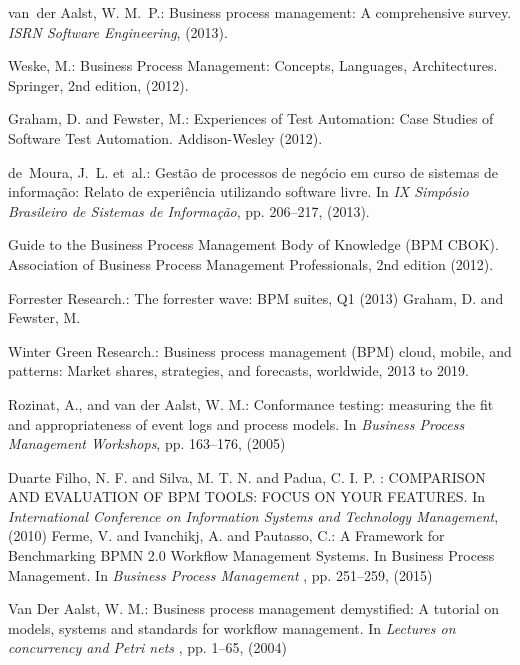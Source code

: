 \documentclass[runningheads,a4paper]{llncs}
\begin{document}
\begin{thebibliography}{4}

van~der Aalst, W. M.~P.: Business process management: A comprehensive survey. {\em ISRN Software Engineering}, (2013).

Weske, M.: Business Process Management: Concepts, Languages, Architectures. Springer, 2nd edition, (2012).

Graham, D. and Fewster, M.: Experiences of Test Automation: Case Studies of Software Test Automation. Addison-Wesley (2012).

de~Moura, J.~L. et~al.: Gestão de processos de negócio em curso de sistemas de
  informação: Relato de experiência utilizando software livre. In {\em IX Simpósio Brasileiro de Sistemas de Informação}, pp.
  206--217, (2013).

 Guide to the Business Process Management Body of Knowledge (BPM
  CBOK). Association of Business Process Management Professionals, 2nd
  edition (2012).

Forrester Research.: The forrester wave: {BPM} suites, {Q1} (2013)
Graham, D. and Fewster, M.


Winter Green Research.: Business process management (BPM) cloud, mobile, and patterns: Market shares, strategies, and forecasts, worldwide, 2013 to 2019.


  
Rozinat, A., and van der Aalst, W. M.: Conformance testing: measuring the fit and appropriateness of event logs and process models. In {\em Business Process Management Workshops}, pp.
  163--176, (2005)
  
Duarte Filho, N. F. and Silva, M. T. N. and Padua, C. I. P. : COMPARISON AND EVALUATION OF BPM TOOLS: FOCUS ON YOUR FEATURES. In {\em International Conference on Information Systems and Technology Management}, (2010)
Ferme, V. and Ivanchikj, A. and Pautasso, C.: A Framework for Benchmarking BPMN 2.0 Workflow Management Systems. In Business Process Management. In {\em Business Process Management }, pp.
  251--259, (2015)
  
Van Der Aalst, W. M.: Business process management demystified: A tutorial on models, systems and standards for workflow management. In {\em Lectures on concurrency and Petri nets }, pp.
  1--65, (2004)


\end{thebibliography}
\end{document}
